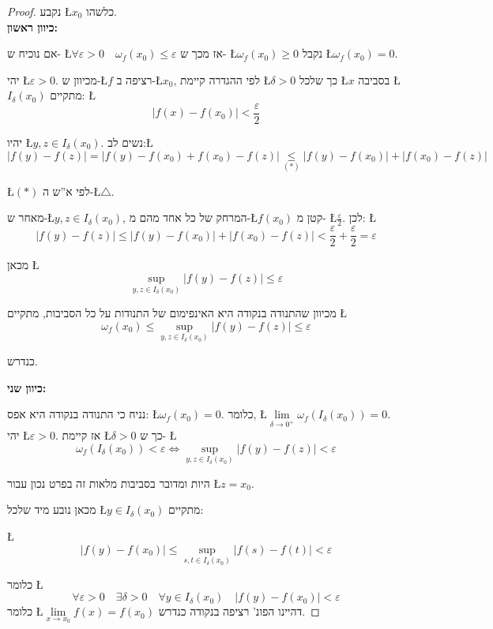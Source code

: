 \documentclass[english,hebrew]{article}
\theoremstyle{remark}
\theoremstyle{definition}
\theoremstyle{plain}
\theoremstyle{remark}
\theoremstyle{plain}
\theoremstyle{plain}
\begin{document}
\begin{proof}
נקבע \L{$x_{0}$} כלשהו.\\

\textbf{כיוון ראשון:}

אם נוכיח ש- \L{$\forall\varepsilon>0\quad\omega_{f}(x_{0})\le\varepsilon$}
אז מכך ש- \L{$\omega_{f}(x_{0})\ge0$} נקבל \L{$\omega_{f}(x_{0})=0$}.

יהי \L{$\varepsilon>0$}. מכיוון ש-\L{$f$} רציפה ב-\L{$x_{0}$},
לפי ההגדרה קיימת \L{$\delta>0$} כך שלכל \L{$x$} בסביבה \L{$I_{\delta}(x_{0})$}
מתקיים: \L{%
\[
|f(x)-f(x_{0})|<\frac{\varepsilon}{2}
\]
}%

יהיו \L{$y,z\in I_{\delta}(x_{0})$}. נשים לב:\L{%
\[
|f(y)-f(z)|=|f(y)-f(x_{0})+f(x_{0})-f(z)|\underset{(*)}{\leq}|f(y)-f(x_{0})|+|f(x_{0})-f(z)|
\]
}%

\L{$(*)$} לפי א\textquotedblright ש ה-\L{$\triangle$}.

מאחר ש-\L{$y,z\in I_{\delta}(x_{0})$}, המרחק של כל אחד מהם מ-\L{$f(x_{0})$}
קטן מ- \L{$\frac{\varepsilon}{2}$}. לכן: \L{%
\[
|f(y)-f(z)|\le|f(y)-f(x_{0})|+|f(x_{0})-f(z)|<\frac{\varepsilon}{2}+\frac{\varepsilon}{2}=\varepsilon
\]
}%

מכאן \L{%
\[
\sup_{y,z\in I_{\delta}(x_{0})}|f(y)-f(z)|\leq\varepsilon
\]
}%

מכיוון שהתנודה בנקודה היא האינפימום של התנודות על כל הסביבות, מתקיים
\L{%
\[
\omega_{f}(x_{0})\leq\sup_{y,z\in I_{\delta}(x_{0})}|f(y)-f(z)|\leq\varepsilon
\]
}%

כנדרש.

\vspace{1em}
\textbf{כיוון שני:}

נניח כי התנודה בנקודה היא אפס: \L{$\omega_{f}(x_{0})=0$}. כלומר,
\L{$\underset{\delta\to0^{+}}{\lim}\omega_{f}(I_{\delta}(x_{0}))=0$}.
יהי \L{$\varepsilon>0$}. אז קיימת \L{$\delta>0$} כך ש- \L{%
\[
\omega_{f}(I_{\delta}(x_{0}))<\varepsilon\iff\sup_{y,z\in I_{\delta}(x_{0})}|f(y)-f(z)|<\varepsilon
\]
}%

היות ומדובר בסביבות מלאות זה בפרט נכון עבור \L{$z=x_{0}$}.

מכאן נובע מיד שלכל \L{$y\in I_{\delta}(x_{0})$} מתקיים:

\L{%
\[
|f(y)-f(x_{0})|\leq\sup_{s,t\in I_{\delta}(x_{0})}|f(s)-f(t)|<\varepsilon
\]
}%

כלומר \L{%
\[
\forall\varepsilon>0\quad\exists\delta>0\quad\forall y\in I_{\delta}(x_{0})\quad|f(y)-f(x_{0})|<\varepsilon
\]
}%
 כלומר \L{$\underset{x\rightarrow x_{0}}{\lim}f(x)=f(x_{0})$} דהיינו
הפונ' רציפה בנקודה כנדרש.
\end{proof}
\end{document}
